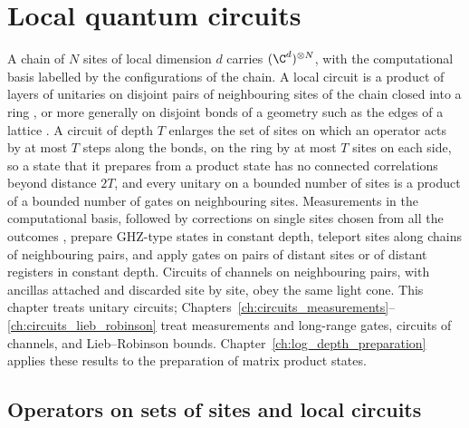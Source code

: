 
\chapter{Local quantum circuits}
\label{ch:local_quantum_circuits}

A chain of $N$ sites of local dimension $d$ carries $(\C^d)^{\otimes N}$, with
the computational basis labelled by the configurations of the chain. A local
circuit is a product of layers of unitaries on disjoint pairs of neighbouring
sites of the chain closed into a ring \cite{Malz2024Preparation}, or more
generally on disjoint bonds of a geometry such as the edges of a lattice
\cite{Piroli2021LOCC}. A circuit of depth $T$ enlarges the set of sites on
which an operator acts by at most $T$ steps along the bonds, on the ring by at
most $T$ sites on each side, so a state that it prepares from a product state
has no connected correlations beyond distance $2T$, and every unitary on a bounded
number of sites is a product of a bounded number of gates on neighbouring
sites. Measurements in the computational basis, followed by corrections on
single sites chosen from all the outcomes \cite{Piroli2021LOCC}, prepare
GHZ-type states in constant depth, teleport sites along chains of neighbouring
pairs, and apply gates on pairs of distant sites or of distant registers in
constant depth. Circuits of channels on neighbouring pairs, with ancillas
attached and discarded site by site, obey the same light cone.
This chapter treats unitary circuits;
Chapters~\ref{ch:circuits_measurements}--\ref{ch:circuits_lieb_robinson} treat
measurements and long-range gates, circuits of channels, and Lieb--Robinson
bounds. Chapter~\ref{ch:log_depth_preparation} applies these results to the
preparation of matrix product states.

\section{Operators on sets of sites and local circuits}
\label{sec:qc_local_circuits}

